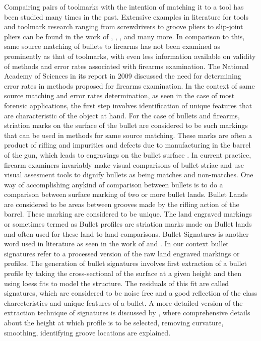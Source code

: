 \documentclass[12pt]{article}
\begin{document}
Compairing pairs of toolmarks with the intention of matching it to a
tool has been studied many times in the past. Extensive examples in
literature for tools and toolmark research ranging from screwdrivers to
groove pliers to slip-joint pliers can be found in the work of
\citet{manytoolmarks1}, \citet{manytoolmarks2}, \citet{miller},
\cite{afte-chumbley} and many more. In comparison to this, same source
matching of bullets to firearms has not been examined as prominently as
that of toolmarks, with even less information available on validity of
methods and error rates associated with firearms examination. The
National Academy of Sciences in its report in 2009 \citep{NAS:2009}
discussed the need for determining error rates in methods proposed for
firearms examination. In the context of same source matching and error
rates determination, as seen in the case of most forensic applications,
the first step involves identification of unique features that are
characteristic of the object at hand. For the case of bullets and
firearms, striation marks on the surface of the bullet are considered to
be such markings that can be used in methods for same source matching.
These marks are often a product of rifling and impurities and defects
due to manufacturing in the barrel of the gun, which leads to engravings
on the bullet surface \citep{afte-article1992}. In current practice,
firearm examiners invariably make visual comparisons of bullet striae
and use visual assesment tools to dignify bullets as being matches and
non-matches. One way of accomplishing anykind of comparison between
bullets is to do a comparison between surface marking of two or more
bullet lands. Bullet Lands are considered to be areas between grooves
made by the rifling action of the barrel. These marking are considered
to be unique. The land engraved markings or sometimes termed as Bullet
profiles \citep{aoas} are striation marks made on Bullet lands and often
used for these land to land comparisons. Bullet Signatures is another
word used in literature as seen in the work of \citet{chu2013} and
\citet{aoas}. In our context bullet signatures refer to a processed
version of the raw land engraved markings or profiles. The generation of
bullet signatures involves first extraction of a bullet profile by
taking the cross-sectional of the surface at a given height and then
using loess fits to model the structure. The residuals of this fit are
called signatures, which are considered to be noise free and a good
reflection of the class charecteristics and unique features of a bullet.
A more detailed version of the extraction technique of signatures is
discussed by \citet{aoas}, where comprehensive details about the height
at which profile is to be selected, removing curvature, smoothing,
identifying groove locations are explained.
\end{document}
